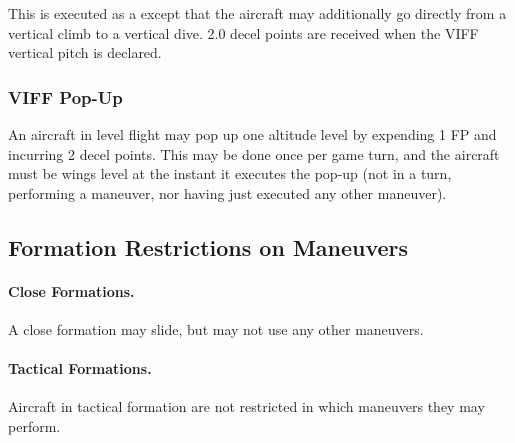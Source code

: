 This is executed as a  except that the aircraft may additionally go directly from a vertical climb to a vertical dive. 2.0 decel points are received when the VIFF vertical pitch is declared.

\subsubsection{VIFF Pop-Up}

An aircraft in level flight may pop up one altitude level by expending 1 FP and incurring 2 decel points. This may be done once per game turn, and the aircraft must be wings level at the instant it executes the pop-up (not in a turn, performing a maneuver, nor having just executed any other maneuver).

\subsection{Formation Restrictions on Maneuvers}

\paragraph{Close Formations.} A close formation may slide, but may not use any other maneuvers.

\paragraph{Tactical Formations.} Aircraft in tactical formation are not restricted in which maneuvers they may perform.